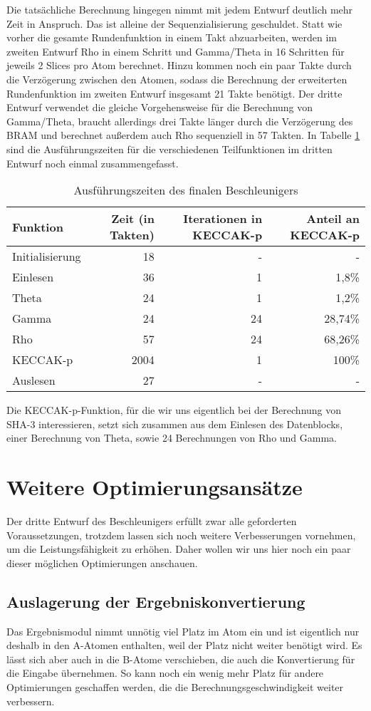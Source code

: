 Die tatsächliche Berechnung hingegen nimmt mit jedem Entwurf deutlich mehr Zeit in Anspruch. Das ist alleine der Sequenzialisierung geschuldet.
Statt wie vorher die gesamte Rundenfunktion in einem Takt abzuarbeiten, werden im zweiten Entwurf Rho in einem Schritt und Gamma/Theta in 16 Schritten für jeweils 2 Slices pro Atom berechnet.
Hinzu kommen noch ein paar Takte durch die Verzögerung zwischen den Atomen, sodass die Berechnung der erweiterten Rundenfunktion im zweiten Entwurf insgesamt 21 Takte benötigt.
Der dritte Entwurf verwendet die gleiche Vorgehensweise für die Berechnung von Gamma/Theta, braucht allerdings drei Takte länger durch die Verzögerung des BRAM
und berechnet außerdem auch Rho sequenziell in 57 Takten. In Tabelle \ref{tab:zeiten_iteration_3} sind die Ausführungszeiten
für die verschiedenen Teilfunktionen im dritten Entwurf noch einmal zusammengefasst.
\begin{table}
    \centering
    \begin{tabular}{lrrr}
    Funktion & Zeit (in Takten) & Iterationen in KECCAK-p & Anteil an KECCAK-p \\
    \hline
    Initialisierung & 18 & - & - \\
    Einlesen & 36 & 1 & 1,8\% \\
    Theta & 24 & 1 & 1,2\% \\
    Gamma & 24 & 24 & 28,74\% \\
    Rho & 57 & 24 & 68,26\% \\
    KECCAK-p & 2004 & 1 & 100\% \\
    Auslesen & 27 & - & -
    \end{tabular}
    \label{tab:zeiten_iteration_3}
    \caption{Ausführungszeiten des finalen Beschleunigers}
\end{table}
Die KECCAK-p-Funktion, für die wir uns eigentlich bei der Berechnung von SHA-3 interessieren, setzt sich zusammen aus dem Einlesen des Datenblocks,
einer Berechnung von Theta, sowie 24 Berechnungen von Rho und Gamma.

\section{Weitere Optimierungsansätze}
Der dritte Entwurf des Beschleunigers erfüllt zwar alle geforderten Voraussetzungen, trotzdem lassen sich noch weitere Verbesserungen vornehmen, um die Leistungsfähigkeit zu erhöhen.
Daher wollen wir uns hier noch ein paar dieser möglichen Optimierungen anschauen.

\subsection{Auslagerung der Ergebniskonvertierung}
Das Ergebnismodul nimmt unnötig viel Platz im Atom ein und ist eigentlich nur deshalb in den A-Atomen enthalten, weil der Platz nicht weiter benötigt wird.
Es lässt sich aber auch in die B-Atome verschieben, die auch die Konvertierung für die Eingabe übernehmen.
So kann noch ein wenig mehr Platz für andere Optimierungen geschaffen werden, die die Berechnungsgeschwindigkeit weiter verbessern.

